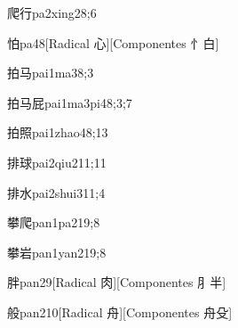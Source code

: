 \begin{verbete}{爬行}{pa2xing2}{8;6}
\end{verbete}

\begin{verbete}{怕}{pa4}{8}[Radical 心][Componentes 忄白]
\end{verbete}

\begin{verbete}{拍马}{pai1ma3}{8;3}
\end{verbete}

\begin{verbete}{拍马屁}{pai1ma3pi4}{8;3;7}
\end{verbete}

\begin{verbete}{拍照}{pai1zhao4}{8;13}
\end{verbete}

\begin{verbete}{排球}{pai2qiu2}{11;11}
\end{verbete}

\begin{verbete}{排水}{pai2shui3}{11;4}
\end{verbete}

\begin{verbete}{攀爬}{pan1pa2}{19;8}
\end{verbete}

\begin{verbete}{攀岩}{pan1yan2}{19;8}
\end{verbete}

\begin{verbete}{胖}{pan2}{9}[Radical 肉][Componentes ⺼半]
\end{verbete}

\begin{verbete}{般}{pan2}{10}[Radical 舟][Componentes 舟殳]
\end{verbete}

